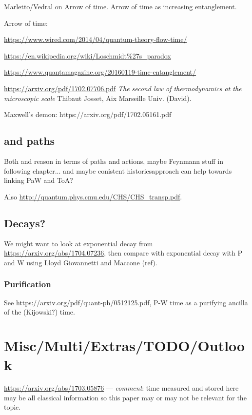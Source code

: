 Marletto/Vedral on Arrow of time. Arrow of time as increasing entanglement.

Arrow of time: 

\url{https://www.wired.com/2014/04/quantum-theory-flow-time/}

\url{https://en.wikipedia.org/wiki/Loschmidt%27s_paradox}

\url{https://www.quantamagazine.org/20160119-time-entanglement/}

\url{https://arxiv.org/pdf/1702.07706.pdf} \textit{The second law of thermodynamics at the microscopic scale}
Thibaut Josset,
Aix Marseille Univ. (David).

Maxwell's demon: https://arxiv.org/pdf/1702.05161.pdf

\subsection{and paths}

Both \cite{YearsleyHalliwell_Clocks} and \cite{Gambini_PW}
reason in terms of paths and actions, maybe Feynmann stuff
in following chapter... and maybe conistent historiesapproach can help
towards linking PaW and ToA?

Also \url{http://quantum.phys.cmu.edu/CHS/CHS_transp.pdf}.

\subsection{Decays?}

We might want to look at exponential decay from \url{https://arxiv.org/abs/1704.07236},
then compare with exponential decay with P and W using Lloyd Giovannetti and Maccone (ref).

\subsubsection{Purification}

See https://arxiv.org/pdf/quant-ph/0512125.pdf, P-W time as a purifying ancilla
of the (Kijowski?) time.

\section{Misc/Multi/Extras/TODO/Outlook}

\url{https://arxiv.org/abs/1703.05876}
--- \emph{comment}: time measured and stored here
may be all classical information
so this paper may or may not be relevant for the topic.

